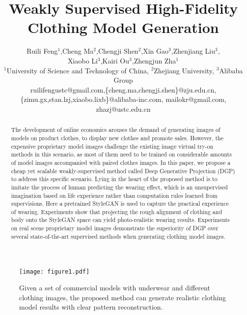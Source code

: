 \documentclass[10pt,twocolumn,letterpaper]{article}
\begin{document}
\title{Weakly Supervised High-Fidelity Clothing Model Generation}

 \author{Ruili Feng$^1$,Cheng Ma$^2$,Chengji Shen$^2$,Xin Gao$^3$,Zhenjiang Liu$^3$,\\
 Xiaobo Li$^3$,Kairi Ou$^3$,Zhengjun Zha$^1$\\
 $^1$University of Science and Technology of China, $^2$Zhejiang University, $^3$Alibaba Group \\
 ruilifengustc@gmail.com,\{cheng.ma,chengji.shen\}@zju.edu.cn, \\ \{zimu.gx,stan.lzj,xiaobo.lixb\}@alibaba-inc.com, mailokr@gmail.com, zhazj@ustc.edu.cn
 }





\maketitle




\begin{abstract}
  The development of online economics arouses the demand of generating images of models on product clothes, to display new clothes and promote sales. However, the expensive  proprietary model images challenge the existing image virtual try-on methods in this scenario, as most of them need to be trained on considerable amounts of model images accompanied with paired clothes images. In this paper, we propose a cheap yet scalable weakly-supervised method called Deep Generative Projection (DGP) to address this specific scenario. Lying in the heart of the proposed method is to imitate the process of human predicting the wearing effect, which is an unsupervised imagination based on life experience rather than computation rules learned from supervisions. Here a pretrained StyleGAN is used to capture the practical experience of wearing. Experiments show that projecting the rough alignment of clothing and body onto the StyleGAN space can yield photo-realistic wearing results. Experiments on real scene proprietary model images demonstrate the superiority of DGP over several state-of-the-art supervised methods when generating clothing model images.
\end{abstract}



\begin{figure}[t]
  \centering
  \texttt{[image: figure1.pdf]}
  \caption{Given a set of commercial models with underwear and different clothing images, the proposed method can generate realistic clothing model results with clear pattern reconstruction.}\label{fig:teaser}
\end{figure}
\end{document}
